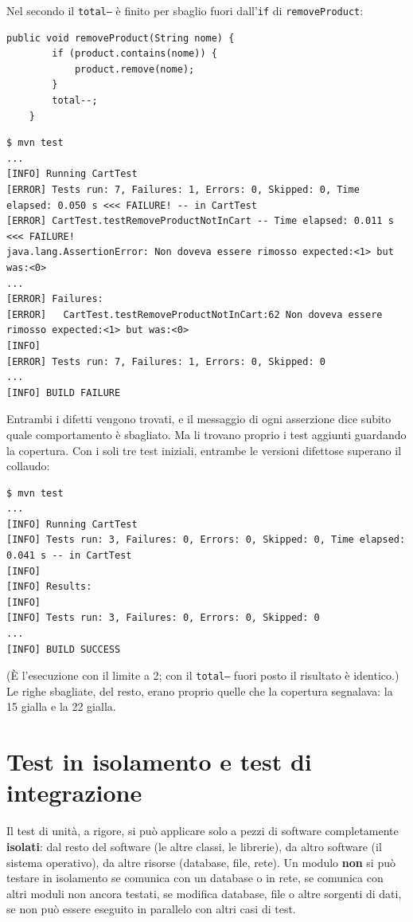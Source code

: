 Nel secondo il \texttt{total--} è finito per sbaglio fuori dall'\texttt{if} di \texttt{removeProduct}:

\begin{lstlisting}[style=java, name=Cart.java, firstnumber=21]
    public void removeProduct(String nome) {
        if (product.contains(nome)) {
            product.remove(nome);
        }
        total--;
    }
\end{lstlisting}

\begin{lstlisting}[style=shell, name=Terminale, deletekeywords={java}]
$ mvn test
...
[INFO] Running CartTest
[ERROR] Tests run: 7, Failures: 1, Errors: 0, Skipped: 0, Time elapsed: 0.050 s <<< FAILURE! -- in CartTest
[ERROR] CartTest.testRemoveProductNotInCart -- Time elapsed: 0.011 s <<< FAILURE!
java.lang.AssertionError: Non doveva essere rimosso expected:<1> but was:<0>
...
[ERROR] Failures:
[ERROR]   CartTest.testRemoveProductNotInCart:62 Non doveva essere rimosso expected:<1> but was:<0>
[INFO]
[ERROR] Tests run: 7, Failures: 1, Errors: 0, Skipped: 0
...
[INFO] BUILD FAILURE
\end{lstlisting}

Entrambi i difetti vengono trovati, e il messaggio di ogni asserzione dice subito quale comportamento è sbagliato. Ma li
trovano proprio i test aggiunti guardando la copertura. Con i soli tre test iniziali, entrambe le versioni difettose
superano il collaudo:

\begin{lstlisting}[style=shell, name=Terminale]
$ mvn test
...
[INFO] Running CartTest
[INFO] Tests run: 3, Failures: 0, Errors: 0, Skipped: 0, Time elapsed: 0.041 s -- in CartTest
[INFO]
[INFO] Results:
[INFO]
[INFO] Tests run: 3, Failures: 0, Errors: 0, Skipped: 0
...
[INFO] BUILD SUCCESS
\end{lstlisting}

(È l'esecuzione con il limite a 2; con il \texttt{total--} fuori posto il risultato è identico.) Le righe sbagliate,
del resto, erano proprio quelle che la copertura segnalava: la 15 gialla e la 22 gialla.

\section{Test in isolamento e test di integrazione}

Il test di unità, a rigore, si può applicare solo a pezzi di software completamente \textbf{isolati}: dal resto del
software (le altre classi, le librerie), da altro software (il sistema operativo), da altre risorse (database, file,
rete). Un modulo \textbf{non} si può testare in isolamento se comunica con un database o in rete, se comunica con altri
moduli non ancora testati, se modifica database, file o altre sorgenti di dati, se non può essere eseguito in parallelo
con altri casi di test.

